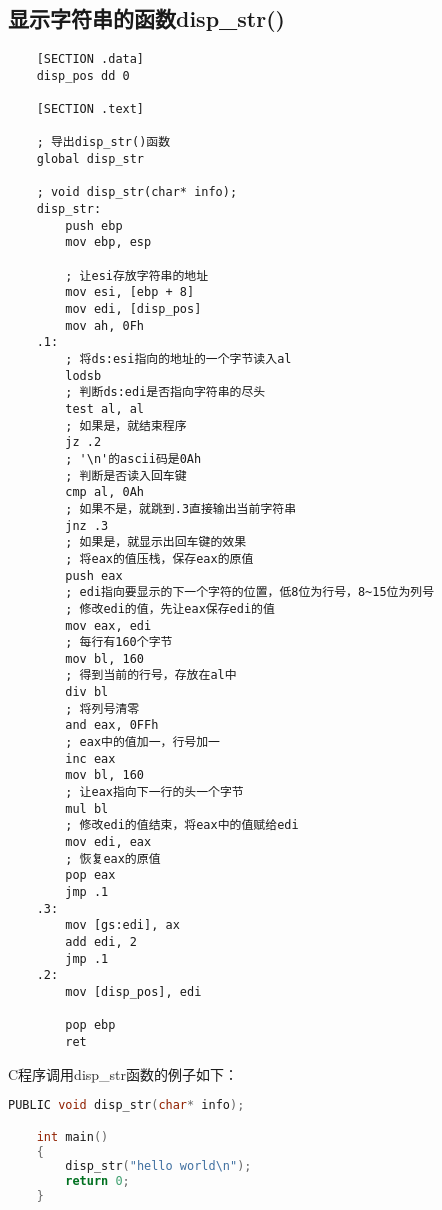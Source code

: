 \documentclass[a4paper,left=2.5cm,right=2.5cm,11pt]{article}
\begin{document}
\subsection{显示字符串的函数disp\_str()}
	\begin{lstlisting}
	[SECTION .data]
	disp_pos dd 0

	[SECTION .text]
	
	; 导出disp_str()函数
	global disp_str

	; void disp_str(char* info);
	disp_str:
		push ebp
		mov ebp, esp

		; 让esi存放字符串的地址
		mov esi, [ebp + 8]
		mov edi, [disp_pos]
		mov ah, 0Fh
	.1:
		; 将ds:esi指向的地址的一个字节读入al
		lodsb
		; 判断ds:edi是否指向字符串的尽头
		test al, al
		; 如果是，就结束程序
		jz .2
		; '\n'的ascii码是0Ah
		; 判断是否读入回车键
		cmp al, 0Ah
		; 如果不是，就跳到.3直接输出当前字符串
		jnz .3
		; 如果是，就显示出回车键的效果
		; 将eax的值压栈，保存eax的原值
		push eax
		; edi指向要显示的下一个字符的位置，低8位为行号，8~15位为列号
		; 修改edi的值，先让eax保存edi的值
		mov eax, edi
		; 每行有160个字节
		mov bl, 160
		; 得到当前的行号，存放在al中
		div bl
		; 将列号清零
		and eax, 0FFh
		; eax中的值加一，行号加一
		inc eax
		mov bl, 160
		; 让eax指向下一行的头一个字节
		mul bl
		; 修改edi的值结束，将eax中的值赋给edi
		mov edi, eax
		; 恢复eax的原值
		pop eax
		jmp .1
	.3:
		mov [gs:edi], ax
		add edi, 2
		jmp .1
	.2:
		mov [disp_pos], edi

		pop ebp
		ret
	\end{lstlisting}

	C程序调用disp\_str函数的例子如下：

	\begin{lstlisting}[language = C]
	PUBLIC void disp_str(char* info);

	int main()
	{
		disp_str("hello world\n");
		return 0;
	}
	\end{lstlisting}
 
\end{document}
